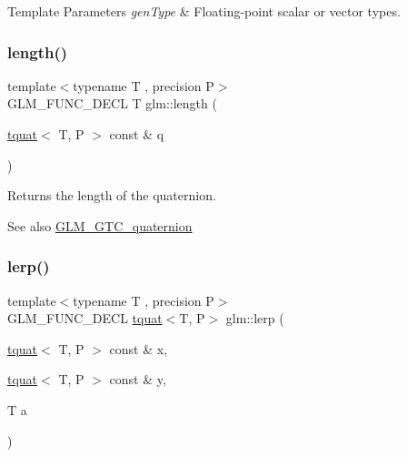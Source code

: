 \begin{DoxyTemplParams}{Template Parameters}
{\em gen\+Type} & Floating-\/point scalar or vector types. \\
\hline
\end{DoxyTemplParams}
\mbox{\label{group__gtc__quaternion_gac682181783027544c8d251b4d3a60cf8}} 
\subsubsection{\texorpdfstring{length()}{length()}}
{\footnotesize\ttfamily template$<$typename T , precision P$>$ \\
G\+L\+M\+\_\+\+F\+U\+N\+C\+\_\+\+D\+E\+CL T glm\+::length (\begin{DoxyParamCaption}\item[{\hyperlink{structglm_1_1tquat}{tquat}$<$ T, P $>$ const \&}]{q }\end{DoxyParamCaption})}

Returns the length of the quaternion.

\begin{DoxySeeAlso}{See also}
\hyperlink{group__gtc__quaternion}{G\+L\+M\+\_\+\+G\+T\+C\+\_\+quaternion} 
\end{DoxySeeAlso}
\mbox{\label{group__gtc__quaternion_ga5692804fa4db9e762a1c19b607e54435}} 
\subsubsection{\texorpdfstring{lerp()}{lerp()}}
{\footnotesize\ttfamily template$<$typename T , precision P$>$ \\
G\+L\+M\+\_\+\+F\+U\+N\+C\+\_\+\+D\+E\+CL \hyperlink{structglm_1_1tquat}{tquat}$<$T, P$>$ glm\+::lerp (\begin{DoxyParamCaption}\item[{\hyperlink{structglm_1_1tquat}{tquat}$<$ T, P $>$ const \&}]{x,  }\item[{\hyperlink{structglm_1_1tquat}{tquat}$<$ T, P $>$ const \&}]{y,  }\item[{T}]{a }\end{DoxyParamCaption})}

